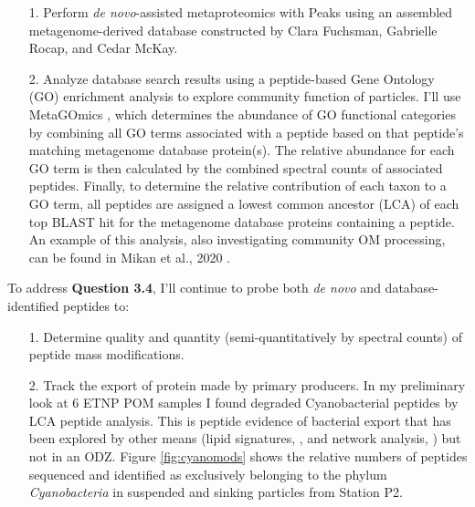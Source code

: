 \documentclass[12pt, letterpaper, twoside]{article}
\begin{document}
\begin{enumerate}
	\item[1.] Perform \textit{de novo}-assisted metaproteomics with Peaks using an assembled metagenome-derived database constructed by Clara Fuchsman, Gabrielle Rocap, and Cedar McKay.
	\item[2.] Analyze database search results using a peptide-based Gene Ontology (GO) enrichment analysis to explore community function of particles. I'll use MetaGOmics \cite{riffle_metagomics_2017}, which determines the abundance of GO functional categories by combining all GO terms associated with a peptide based on that peptide's matching metagenome database protein(s). The relative abundance for each GO term is then calculated by the combined spectral counts of associated peptides. Finally, to determine the relative contribution of each taxon to a GO term, all peptides are assigned a lowest common ancestor (LCA) of each top BLAST hit for the metagenome database proteins containing a peptide. An example of this analysis, also investigating community OM processing, can be found in Mikan et al., 2020 \cite{mikan_metaproteomics_2020}.
\end{enumerate}  

To address \textbf{Question 3.4}, I'll continue to probe both \textit{de novo} and database-identified peptides to:

\begin{enumerate}
	\item[1.] Determine quality and quantity (semi-quantitatively by spectral counts) of peptide mass modifications.
	\item[2.] Track the export of protein made by primary producers. In my preliminary look at 6 ETNP POM samples I found degraded Cyanobacterial peptides by LCA peptide analysis. This is peptide evidence of bacterial export that has been explored by other means (lipid signatures, \cite{close_export_2013}, and network analysis, \cite{richardson_small_2007}) but not in an ODZ. Figure \ref{fig:cyanomods} shows the relative numbers of peptides sequenced and identified as exclusively belonging to the phylum \textit{Cyanobacteria} in suspended and sinking particles from Station P2.
\end{enumerate}
\end{document}
